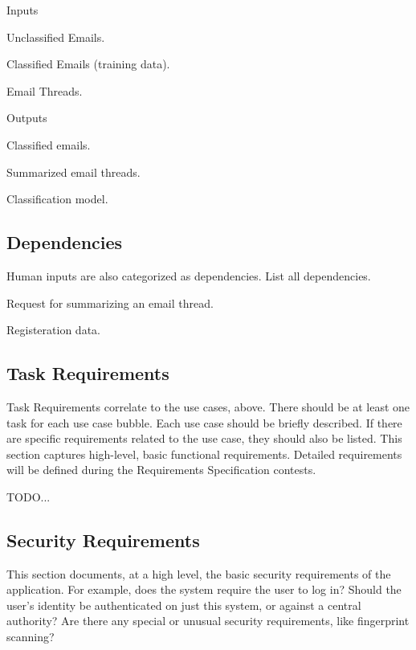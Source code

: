 \documentclass[a4paper,10pt]{article}
\newenvironment{my_itemize}
{\begin{itemize}
  \setlength{\itemsep}{0cm}
  \setlength{\parskip}{0cm}}
{\end{itemize}}
\newenvironment{my_enumerate}
{\begin{enumerate}
  \setlength{\itemsep}{0cm}
  \setlength{\parskip}{0cm}}
{\end{enumerate}}
\begin{document}
\begin{my_enumerate}
  \item Inputs
  \begin{my_itemize}
    \item Unclassified Emails.
    \item Classified Emails (training data).
    \item Email Threads.
  \end{my_itemize}
  \item Outputs
  \begin{my_itemize}
    \item Classified emails.
    \item Summarized email threads.
    \item Classification model.
  \end{my_itemize}
\end{my_enumerate}


\subsection{Dependencies}
Human inputs are also categorized as dependencies.  List all dependencies.

\begin{my_enumerate}
  \item Request for summarizing an email thread.
  \item Registeration data.
\end{my_enumerate}


\subsection{Task Requirements}
Task Requirements correlate to the use cases, above. There should be at least 
one task for each use case bubble. Each use case should be briefly described. 
If there are specific requirements related to the use case, they should also 
be listed. This section captures high-level, basic functional requirements. 
Detailed requirements will be defined during the Requirements Specification contests.

TODO...
\subsection{Security Requirements}
This section documents, at a high level, the basic security requirements of the 
application. For example, does the system require the user to log in?  Should the 
user’s identity be authenticated on just this system, or against a central authority?  
Are there any special or unusual security requirements, like fingerprint scanning?
\end{document}
